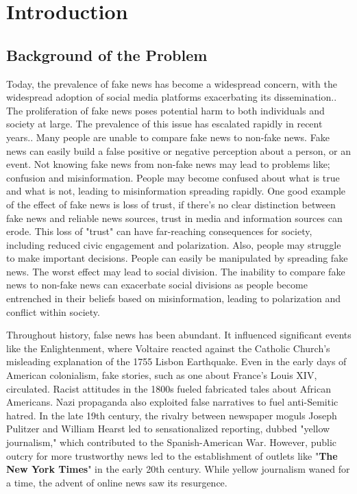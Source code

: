 
\chapter{Introduction}
\begin{refsection}
\section{Background of the Problem}

Today, the prevalence of fake news has become a widespread concern, with the widespread adoption of social media platforms exacerbating its dissemination.\cite{zhang_fake_2023}. The proliferation of fake news poses potential harm to both individuals and society at large. The prevalence of this issue has escalated rapidly in recent years.\cite{inproceedings1}. Many people are unable to compare fake news to non-fake news. Fake news can easily build a false positive or negative perception about a person, or an event. Not knowing fake news from non-fake news may lead to problems like; confusion and misinformation. People may become confused about what is true and what is not, leading to misinformation spreading rapidly. One good example of the effect of fake news is loss of trust, if there's no clear distinction between fake news and reliable news sources, trust in media and information sources can erode. This loss of "trust" can have far-reaching consequences for society, including reduced civic engagement and polarization. Also, people may struggle to make important decisions. People can easily be manipulated by spreading fake news. The worst effect may lead to social division. The inability to compare fake news to non-fake news can exacerbate social divisions as people become entrenched in their beliefs based on misinformation, leading to polarization and conflict within society.


Throughout history, false news has been abundant. It influenced significant events like the Enlightenment, where Voltaire reacted against the Catholic Church's misleading explanation of the 1755 Lisbon Earthquake. Even in the early days of American colonialism, fake stories, such as one about France's Louis XIV, circulated. Racist attitudes in the 1800s fueled fabricated tales about African Americans. Nazi propaganda also exploited false narratives to fuel anti-Semitic hatred. In the late 19th century, the rivalry between newspaper moguls Joseph Pulitzer and William Hearst led to sensationalized reporting, dubbed "yellow journalism," which contributed to the Spanish-American War. However, public outcry for more trustworthy news led to the establishment of outlets like "\textbf{The New York Times}" in the early 20th century. While yellow journalism waned for a time, the advent of online news saw its resurgence\cite{flanagin_online_2017}.


\end{refsection}
